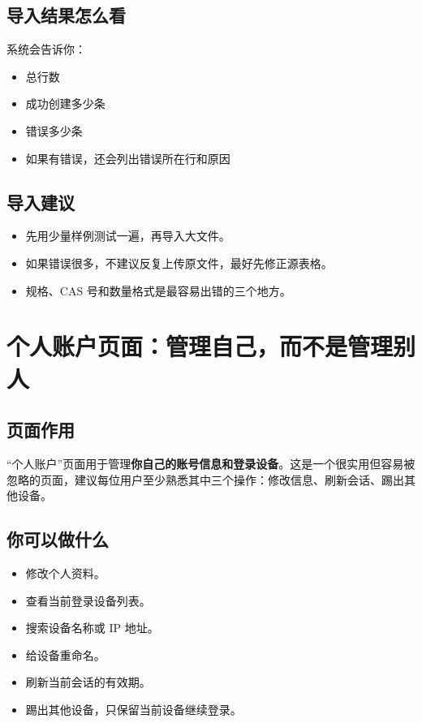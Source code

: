 \documentclass[12pt,a4paper]{ctexart}
\begin{document}
\subsection{导入结果怎么看}
系统会告诉你：
\begin{itemize}
  \item 总行数
  \item 成功创建多少条
  \item 错误多少条
  \item 如果有错误，还会列出错误所在行和原因
\end{itemize}

\subsection{导入建议}
\begin{itemize}
  \item 先用少量样例测试一遍，再导入大文件。
  \item 如果错误很多，不建议反复上传原文件，最好先修正源表格。
  \item 规格、CAS 号和数量格式是最容易出错的三个地方。
\end{itemize}

\newpage
\section{个人账户页面：管理自己，而不是管理别人}

\subsection{页面作用}
“个人账户”页面用于管理\textbf{你自己的账号信息和登录设备}。这是一个很实用但容易被忽略的页面，建议每位用户至少熟悉其中三个操作：修改信息、刷新会话、踢出其他设备。

\subsection{你可以做什么}
\begin{itemize}
  \item 修改个人资料。
  \item 查看当前登录设备列表。
  \item 搜索设备名称或 IP 地址。
  \item 给设备重命名。
  \item 刷新当前会话的有效期。
  \item 踢出其他设备，只保留当前设备继续登录。
\end{itemize}
\end{document}
